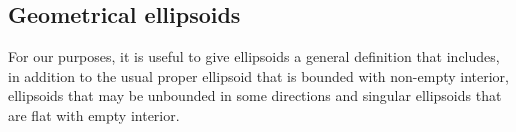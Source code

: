 \subsection{Geometrical ellipsoids}

For our purposes, it is useful to give ellipsoids a general definition that includes, in addition to the usual proper ellipsoid that is bounded with non-empty interior,  ellipsoids that may be unbounded in some directions and singular ellipsoids that are flat with empty interior.
%
%
%

